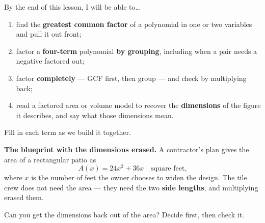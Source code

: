 \documentclass[10pt]{article}
\begin{document}

\vspace{0.15in}

\begin{objectivebox}
\small
By the end of this lesson, I will be able to\dots
\begin{enumerate}[leftmargin=1.5em, itemsep=2pt, topsep=3pt]
  \item find the \textbf{greatest common factor} of a polynomial in one or two variables and pull
        it out front;
  \item factor a \textbf{four-term} polynomial \textbf{by grouping}, including when a pair needs a
        negative factored out;
  \item factor \textbf{completely} --- GCF first, then group --- and check by multiplying back;
  \item read a factored area or volume model to recover the \textbf{dimensions} of the figure it
        describes, and say what those dimensions mean.
\end{enumerate}
\end{objectivebox}

\vspace{0.10in}

\boxguard
\begin{vocabbox}
\small
Fill in each term as we build it together.
\end{vocabbox}

\vspace{0.10in}

\boxguard[12]
\begin{hookbox}
\small
\textbf{The blueprint with the dimensions erased.} A contractor's plan gives the area of a
rectangular patio as
\[ A(x) = 24x^2+36x \quad \text{square feet,} \]
where $x$ is the number of feet the owner chooses to widen the design. The tile crew does not need
the area --- they need the two \textbf{side lengths}, and multiplying erased them.

Can you get the dimensions back out of the area? Decide first, then check it.

\end{hookbox}
\end{document}
